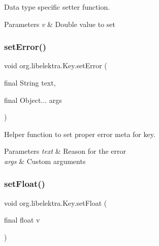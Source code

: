 Data type specific setter function. 


\begin{DoxyParams}{Parameters}
{\em v} & Double value to set \\
\hline
\end{DoxyParams}
\mbox{\label{classorg_1_1libelektra_1_1Key_a1f71503902725f238f81a1211eb5d9d5}} 
\subsubsection{\texorpdfstring{set\+Error()}{setError()}}
{\footnotesize\ttfamily void org.\+libelektra.\+Key.\+set\+Error (\begin{DoxyParamCaption}\item[{final String}]{text,  }\item[{final Object...}]{args }\end{DoxyParamCaption})\hspace{0.3cm}{\ttfamily [inline]}}



Helper function to set proper error meta for key. 


\begin{DoxyParams}{Parameters}
{\em text} & Reason for the error \\
\hline
{\em args} & Custom arguments \\
\hline
\end{DoxyParams}
\mbox{\label{classorg_1_1libelektra_1_1Key_a1436207a0efa244538c935766b8db470}} 
\subsubsection{\texorpdfstring{set\+Float()}{setFloat()}}
{\footnotesize\ttfamily void org.\+libelektra.\+Key.\+set\+Float (\begin{DoxyParamCaption}\item[{final float}]{v }\end{DoxyParamCaption})\hspace{0.3cm}{\ttfamily [inline]}}



